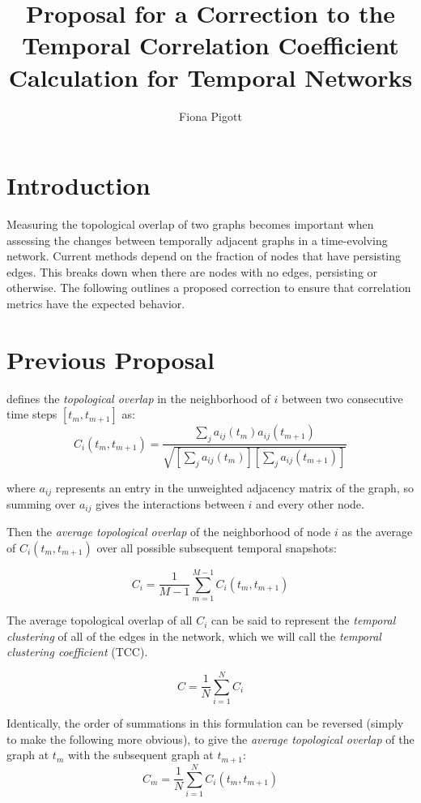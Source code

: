 \documentclass[12pt]{article}
\title{Proposal for a Correction to the Temporal Correlation Coefficient Calculation for Temporal Networks}
\author{Fiona Pigott}
\begin{document}
\maketitle

\section{Introduction}
Measuring the topological overlap of two graphs becomes important when assessing the changes between temporally adjacent graphs in a time-evolving network. Current methods depend on the fraction of nodes that have persisting edges. This breaks down when there are nodes with no edges, persisting or otherwise. The following outlines a proposed correction to ensure that correlation metrics have the expected behavior.

\section{Previous Proposal}
\cite{1} defines the \emph{topological overlap} in the neighborhood of \(i\) between two consecutive time steps \([t_m,t_{m+1}]\) as:
\begin{equation}
C_i(t_m,t_{m+1}) = \frac{ \sum_j a_{ij}(t_m)a_{ij}(t_{m+1})}{\sqrt{[ \sum_j a_{ij}(t_m)][ \sum_j a_{ij}(t_{m+1})]}}
\label{eq:Ci}
\end{equation}

where \(a_{ij}\) represents an entry in the unweighted adjacency matrix of the graph, so summing over \(a_{ij}\) gives the interactions between \(i\) and every other node.

Then the \emph{average topological overlap} of the neighborhood of node \(i\) as the average of \(C_i(t_m,t_{m+1})\) over all possible subsequent temporal snapshots:

\begin{equation}
C_i = \frac{1}{M-1} \sum_{m=1}^{M-1} C_i(t_m,t_{m+1})
\label{eq:Ci1}
\end{equation} 

The average topological overlap of all \(C_i\) can be said to represent the \emph{temporal clustering} of all of the edges in the network, which we will call the \emph{temporal clustering coefficient} (TCC).

\begin{equation}
C = \frac{1}{N}\sum_{i = 1}^{N} C_i
\label{eq:C1}
\end{equation}

Identically, the order of summations in this formulation can be reversed (simply to make the following more obvious), to give the \emph{average topological overlap} of the graph at \(t_m\) with the subsequent graph at \(t_{m+1}\):
\begin{equation}
C_m = \frac{1}{N} \sum_{i = 1}^{N} C_i(t_m,t_{m+1})
\label{eq:Cm1}
\end{equation}
\end{document}
